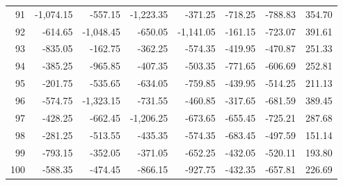 \begin{longtable}{rrrrrrrr}
91 & -1,074.15 & -557.15 & -1,223.35 & -371.25 & -718.25 & -788.83 & 354.70  \\
92 & -614.65 & -1,048.45 & -650.05 & -1,141.05 & -161.15 & -723.07 & 391.61  \\
93 & -835.05 & -162.75 & -362.25 & -574.35 & -419.95 & -470.87 & 251.33  \\
94 & -385.25 & -965.85 & -407.35 & -503.35 & -771.65 & -606.69 & 252.81  \\
95 & -201.75 & -535.65 & -634.05 & -759.85 & -439.95 & -514.25 & 211.13  \\
96 & -574.75 & -1,323.15 & -731.55 & -460.85 & -317.65 & -681.59 & 389.45  \\
97 & -428.25 & -662.45 & -1,206.25 & -673.65 & -655.45 & -725.21 & 287.68  \\
98 & -281.25 & -513.55 & -435.35 & -574.35 & -683.45 & -497.59 & 151.14  \\
99 & -793.15 & -352.05 & -371.05 & -652.25 & -432.05 & -520.11 & 193.80  \\
100 & -588.35 & -474.45 & -866.15 & -927.75 & -432.35 & -657.81 & 226.69  \\

\end{longtable}


